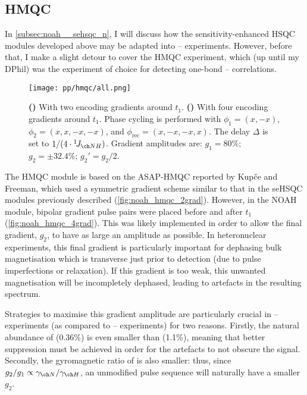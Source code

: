 \subsection{\texorpdfstring{\nitrogen{}}{15N} HMQC}
\label{subsec:noah__hmqc}

In \cref{subsec:noah__sehsqc_n}, I will discuss how the sensitivity-enhanced HSQC modules developed above may be adapted into \proton{}--\nitrogen{} experiments.
However, before that, I make a slight detour to cover the \nitrogen{} HMQC experiment, which (up until my DPhil) was the experiment of choice for detecting one-bond \proton{}--\nitrogen{} correlations.

\begin{figure}[htb]
    \centering
    \texttt{[image: pp/hmqc/all.png]}%
    {\label{fig:noah_hmqc_2grad}}%
    {\label{fig:noah_hmqc_4grad}}%
    \caption[NOAH HMQC pulse sequences]{
        \textbf{()} With two encoding gradients around $t_1$.
        \textbf{()} With four encoding gradients around $t_1$.
        Phase cycling is performed with $\phi_1 = (x, -x)$, $\phi_2 = (x, x, -x, -x)$, and $\phi_\text{rec} = (x, -x, -x, x)$.
        The delay $\Delta$ is set to $1 / (4 \cdot \oneJ{NH})$.
        Gradient amplitudes are: $g_1 = 80\%$; $g_2 = \pm 32.4\%$; $g_2' = g_2/2$.
    }
    \label{fig:noah_hmqc}
\end{figure}

The HMQC module is based on the ASAP-HMQC reported by Kup{\v{c}}e and Freeman\autocite{Kupce2007MRC}, which used a symmetric gradient scheme similar to that in the seHSQC modules previously described (\cref{fig:noah_hmqc_2grad}).
However, in the NOAH module\autocite{Kupce2017ACIE}, bipolar gradient pulse pairs were placed before and after $t_1$ (\cref{fig:noah_hmqc_4grad}).
This was likely implemented in order to allow the final gradient, $g_2$, to have as large an amplitude as possible.
In heteronuclear experiments, this final gradient is particularly important for dephasing bulk magnetisation which is transverse just prior to detection (due to pulse imperfections or relaxation).
If this gradient is too weak, this unwanted magnetisation will be incompletely dephased, leading to artefacts in the resulting spectrum.

Strategies to maximise this gradient amplitude are particularly crucial in \proton{}--\nitrogen{} experiments (as compared to \proton{}--\carbon{} experiments) for two reasons.
Firstly, the natural abundance of \nitrogen{} (0.36\%) is even smaller than \carbon{} (1.1\%), meaning that better suppression must be achieved in order for the artefacts to not obscure the signal.
Secondly, the gyromagnetic ratio of \nitrogen{} is also smaller: thus, since $g_2/g_1 \propto \gammaN/\gammaH$, an unmodified pulse sequence will naturally have a smaller $g_2$.


